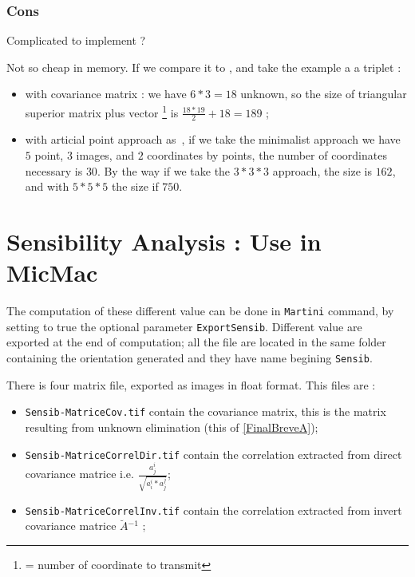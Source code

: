 \subsubsection{Cons}

Complicated to implement ?

Not so cheap in memory. If we compare it to \cite{StrLessPoint}, and take the example a a triplet :

\begin{itemize}
   \item with covariance matrix : we have $6*3=18$ unknown, so the size of triangular
        superior  matrix plus vector \footnote{= number of coordinate to transmit} is
         $\frac{18*19}{2} +18 = 189$ ;
         
   \item with articial point approach as~\cite{StrLessPoint}, if we take the minimalist 
         approach we have $5$ point, $3$ images,
         and $2$ coordinates by points, the number of coordinates necessary is $30$. 
         By the way if we take the $3*3*3$ approach,
         the size is $162$, and with $5*5*5$ the size if $750$. 
\end{itemize}




\section{Sensibility Analysis : Use in MicMac}

The computation of these different value can be done in {\tt Martini} command,
by setting to true the optional parameter {\tt ExportSensib}. Different
value are exported at the end of computation; all the file are located
in the same folder containing the orientation generated and they  have name
begining  {\tt Sensib}.


There is four matrix file, exported as images in float format. This files
are : 

\begin{itemize}
     \item {\tt Sensib-MatriceCov.tif}  contain the covariance matrix,
           this is the matrix resulting from unknown elimination (this of \ref{FinalBreveA});

     \item {\tt Sensib-MatriceCorrelDir.tif}  contain the correlation extracted from
           direct covariance matrice i.e.  $ \frac{a^i_j}{\sqrt{a^i_i * a^j_j}}$;

     \item {\tt Sensib-MatriceCorrelInv.tif}  contain the correlation extracted from
           invert covariance matrice $\breve{A} {^{-1}}$  ;
\end{itemize}

